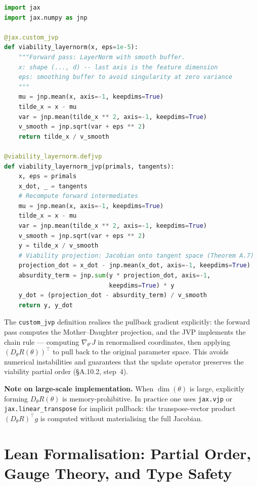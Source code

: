 \documentclass[11pt,a4paper]{article}
\theoremstyle{definition}
\theoremstyle{remark}
\begin{document}
\begin{lstlisting}[language=Python,caption={Viability LayerNorm with custom JVP}]
import jax
import jax.numpy as jnp

@jax.custom_jvp
def viability_layernorm(x, eps=1e-5):
    """Forward pass: LayerNorm with smooth buffer.
    x: shape (..., d) -- last axis is the feature dimension
    eps: smoothing buffer to avoid singularity at zero variance
    """
    mu = jnp.mean(x, axis=-1, keepdims=True)
    tilde_x = x - mu
    var = jnp.mean(tilde_x ** 2, axis=-1, keepdims=True)
    v_smooth = jnp.sqrt(var + eps ** 2)
    return tilde_x / v_smooth

@viability_layernorm.defjvp
def viability_layernorm_jvp(primals, tangents):
    x, eps = primals
    x_dot, _ = tangents
    # Recompute forward intermediates
    mu = jnp.mean(x, axis=-1, keepdims=True)
    tilde_x = x - mu
    var = jnp.mean(tilde_x ** 2, axis=-1, keepdims=True)
    v_smooth = jnp.sqrt(var + eps ** 2)
    y = tilde_x / v_smooth
    # Viability projection: Jacobian onto tangent space (Theorem A.7)
    projection_dot = x_dot - jnp.mean(x_dot, axis=-1, keepdims=True)
    absurdity_term = jnp.sum(y * projection_dot, axis=-1,
                             keepdims=True) * y
    y_dot = (projection_dot - absurdity_term) / v_smooth
    return y, y_dot
\end{lstlisting}

The \texttt{custom\_jvp} definition realises the pullback gradient explicitly: the forward pass computes the Mother--Daughter projection, and the JVP implements the chain rule --- computing $\nabla_{\theta'} J$ in renormalised coordinates, then applying $(D_\theta R(\theta))^\top$ to pull back to the original parameter space. This avoids numerical instabilities and guarantees that the update operator preserves the viability partial order (\S A.10.2, step~4).

\textbf{Note on large-scale implementation.} When $\dim(\theta)$ is large, explicitly forming $D_\theta R(\theta)$ is memory-prohibitive. In practice one uses \texttt{jax.vjp} or \texttt{jax.linear\_transpose} for implicit pullback: the transpose-vector product $(D_\theta R)^\top g$ is computed without materialising the full Jacobian.


\section{Lean Formalisation: Partial Order, Gauge Theory, and Type Safety}
\end{document}
